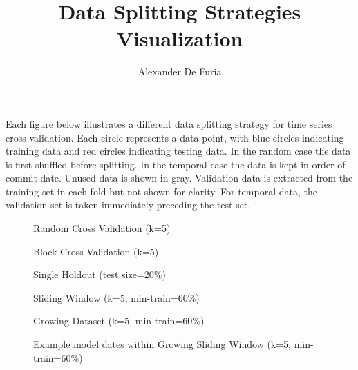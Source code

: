 \documentclass[11pt]{article}
\title{Data Splitting Strategies Visualization}
\author{Alexander De Furia}
\newcommand{\sizeRandomCV}{1.0}
\newcommand{\sizeBlockCV}{1.0}
\newcommand{\sizeSingleHoldout}{1.0}
\newcommand{\sizeSlidingWindow}{1.0}
\newcommand{\sizeGrowingDataset}{1.0}
\newcommand{\sizeGrowingWindowDates}{1.0}
\begin{document}
\maketitle

\vspace{-0.5cm}
Each figure below illustrates a different data splitting strategy for time series cross-validation. Each circle represents a data point, with blue circles indicating training data and red circles indicating testing data. In the random case the data is first shuffled before splitting. In the temporal case the data is kept in order of commit-date. Unused data is shown in gray. Validation data is extracted from the training set in each fold but not shown for clarity. For temporal data, the validation set is taken immediately preceding the test set.

\begin{figure}[!ht]
  \centering
  \resizebox{\sizeRandomCV\textwidth}{!}{%
    
  }%
  \label{fig:rand_cv}
  \caption{Random Cross Validation (k=5)}
\end{figure}

\begin{figure}[!ht]
  \centering
  \resizebox{\sizeBlockCV\textwidth}{!}{%
    
  }%
  \label{fig:block_cv}
  \caption{Block Cross Validation (k=5)}
\end{figure}

\begin{figure}[!ht]
  \centering
  \resizebox{\sizeSingleHoldout\textwidth}{!}{%
    
  }%
  \label{fig:single_holdout}
  \caption{Single Holdout (test size=20\%)}
\end{figure}

\begin{figure}[!ht]
  \centering
  \resizebox{\sizeSlidingWindow\textwidth}{!}{%
    
  }%
  \label{fig:sliding_window}
  \caption{Sliding Window (k=5, min-train=60\%)}
\end{figure}

\begin{figure}[!ht]
  \centering
  \resizebox{\sizeGrowingDataset\textwidth}{!}{%
    
  }%
  \label{fig:growing_dataset}
  \caption{Growing Dataset (k=5, min-train=60\%)}
\end{figure}

\pagebreak

\begin{figure}[!ht]
  \vspace{3cm}
  \centering
  \resizebox{\sizeGrowingWindowDates\textwidth}{!}{%
    
  }%
  \label{fig:growing_window_dates}
  \caption{Example model dates within Growing Sliding Window (k=5, min-train=60\%)}
\end{figure}
\end{document}
